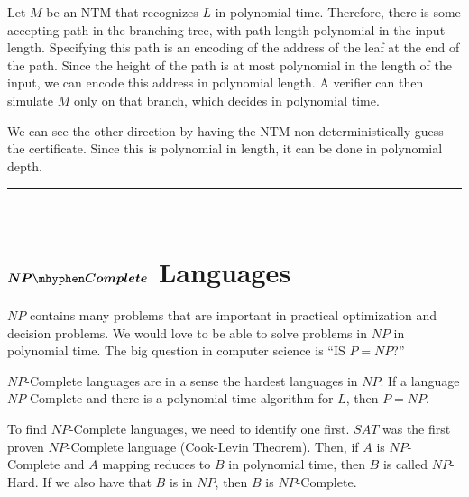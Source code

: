\documentclass[twoside]{article}
\newenvironment{proof}{{\bf Proof:}}{\hfill\rule{2mm}{2mm}}
\begin{document}
\begin{proof}
	Let $M$ be an NTM that recognizes $L$ in polynomial time.  Therefore, there is some accepting path in the branching tree, with path length polynomial in the input length.  Specifying this path is an encoding of the address of the leaf at the end of the path.  Since the height of the path is at most polynomial in the length of the input, we can encode this address in polynomial length.  A verifier can then simulate $M$ only on that branch, which decides in polynomial time.
	
	We can see the other direction by having the NTM non-deterministically guess the certificate.  Since this is polynomial in length, it can be done in polynomial depth.
\end{proof}\\


\section*{$\boldsymbol{NP\mhyphen Complete}$ Languages}
$NP$ contains many problems that are important in practical optimization and decision problems.  We would love to be able to solve problems in $NP$ in polynomial time.  The big question in computer science is ``IS $P=NP$?''

$NP$-Complete languages are in a sense the hardest languages in $NP$.  If a language $NP$-Complete and there is a polynomial time algorithm for $L$, then $P=NP$.


To find $NP$-Complete languages, we need to identify one first.  $SAT$ was the first proven $NP$-Complete language (Cook-Levin Theorem).  Then, if $A$ is $NP$-Complete and $A$ mapping reduces to $B$ in polynomial time, then $B$ is called $NP$-Hard.  If we also have that $B$ is in $NP$, then $B$ is $NP$-Complete.

\end{document}
